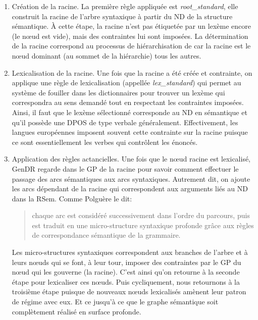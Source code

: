 \begin{enumerate}
  \item Création de la racine.
  La première règle appliquée est \emph{root\_standard}, elle construit la racine de l'arbre syntaxique à partir du \ac{ND} de la structure sémantique. À cette étape, la racine n'est pas étiquetée par un lexème encore (le n\oe{}ud est vide), mais des contraintes lui sont imposées. La détermination de la racine correspond au processus de hiérarchisation de \cite{PolguereStructurationmisejeu1990} car la racine est le n\oe{}ud dominant (au sommet de la hiérarchie) tous les autres.

  \item Lexicalisation de la racine.
  Une fois que la racine a été créée et contrainte, on applique une règle de lexicalisation (appellée \emph{lex\_standard}) qui permet au système de fouiller dans les dictionnaires pour trouver un lexème qui correspondra au sens demandé tout en respectant les contraintes imposées. Ainsi, il faut que le lexème sélectionné corresponde au \ac{ND} en sémantique et qu'il possède une \ac{DPOS} de type verbale généralement. Effectivement, les langues européennes imposent souvent cette contrainte sur la racine puisque ce sont essentiellement les verbes qui contrôlent les énoncés.

  \item Application des règles actancielles.
  Une fois que le n\oe{}ud racine est lexicalisé, GenDR regarde dans le \ac{GP} de la racine pour savoir comment effectuer le passage des arcs sémantiques aux arcs syntaxiques. Autrement dit, on ajoute les arcs dépendant de la racine qui correspondent aux arguments liés au \ac{ND} dans la \ac{RSem}. Comme Polguère le dit:
\begin{quote}
chaque arc est considéré successivement dans l'ordre du parcours, puis est traduit en une micro-structure syntaxique profonde grâce aux règles de correspondance sémantique de la grammaire.
\end{quote}
\vspace{-\baselineskip}
\hfill
\cite[p.~273]{PolguereStructurationmisejeu1990}

Les micro-structures syntaxiques correspondent aux branches de l'arbre et à leurs n\oe{}uds qui se font, à leur tour, imposer des contraintes par le \ac{GP} du n\oe{}ud qui les gouverne (la racine). C'est ainsi qu'on retourne à la seconde étape pour lexicaliser ces n\oe{}uds. Puis cycliquement, nous retournons à la troisième étape puisque de nouveaux n\oe{}uds lexicalisés amènent leur patron de régime avec eux. Et ce jusqu'à ce que le graphe sémantique soit complètement réalisé en surface profonde.
\end{enumerate} 

